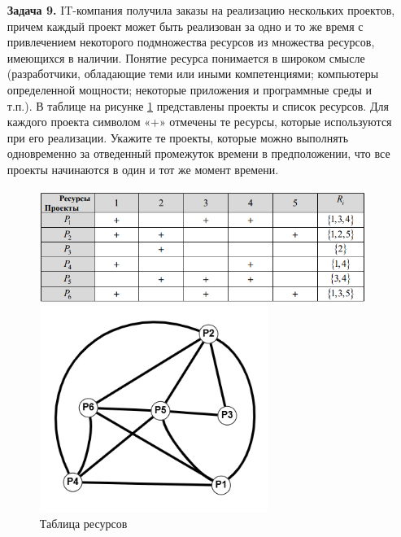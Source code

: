 \documentclass{article}
\begin{document}
\clearpage%
\begin{enumerate} 
\item[\textbf{Задача 9.}]IT-компания получила заказы на реализацию нескольких проектов, причем каждый проект может быть реализован за одно и то же время с привлечением некоторого подмножества ресурсов из множества ресурсов, имеющихся в наличии. Понятие ресурса понимается в широком смысле (разработчики, обладающие теми или иными компетенциями; компьютеры определенной мощности; некоторые приложения и программные среды и т.п.). В таблице на рисунке \ref{fig:9_table} представлены проекты и список ресурсов. Для каждого проекта символом «+» отмечены те ресурсы, которые используются при его реализации.
Укажите те проекты, которые можно выполнять одновременно за отведенный
промежуток времени в предположении, что все проекты начинаются в один и тот же момент времени.
\begin{figure}[ht]
  \begin{minipage}[b]{0.65\textwidth}
    \centering
    \includegraphics[width=\textwidth, center]{attachments/9/0.png}
    \caption{Таблица ресурсов}
    \label{fig:9_table}
  \end{minipage}
  \hfill
  \begin{minipage}[b]{.35\textwidth}
    \centering
    \includegraphics[width=0.7\textwidth, center]{attachments/9/1.png}

\end{minipage}
\end{figure}
\end{enumerate}
\end{document}
